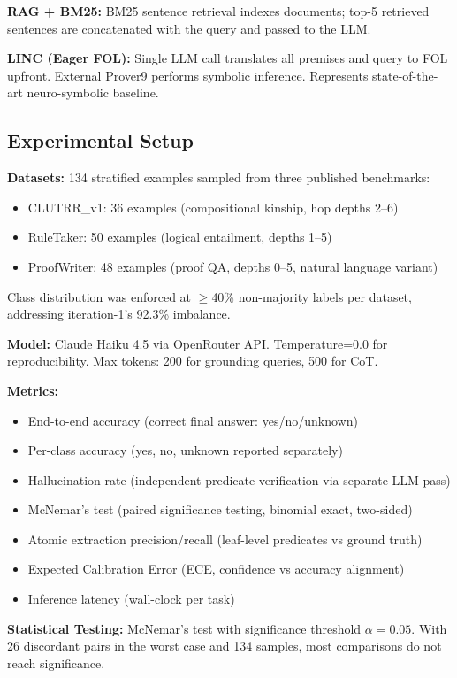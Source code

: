 \documentclass[11pt,letterpaper]{article}
\begin{document}
\textbf{RAG + BM25:} BM25 sentence retrieval indexes documents; top-5 retrieved sentences are concatenated with the query and passed to the LLM.

\textbf{LINC (Eager FOL):} Single LLM call translates all premises and query to FOL upfront. External Prover9 performs symbolic inference. Represents state-of-the-art neuro-symbolic baseline.

\subsection{Experimental Setup}

\textbf{Datasets:} 134 stratified examples sampled from three published benchmarks:
\begin{itemize}
  \item CLUTRR\_v1: 36 examples (compositional kinship, hop depths 2--6)
  \item RuleTaker: 50 examples (logical entailment, depths 1--5)
  \item ProofWriter: 48 examples (proof QA, depths 0--5, natural language variant)
\end{itemize}

Class distribution was enforced at $\geq$40\% non-majority labels per dataset, addressing iteration-1's 92.3\% imbalance.

\textbf{Model:} Claude Haiku 4.5 via OpenRouter API. Temperature=0.0 for reproducibility. Max tokens: 200 for grounding queries, 500 for CoT.

\textbf{Metrics:}
\begin{itemize}
  \item End-to-end accuracy (correct final answer: yes/no/unknown)
  \item Per-class accuracy (yes, no, unknown reported separately)
  \item Hallucination rate (independent predicate verification via separate LLM pass)
  \item McNemar's test (paired significance testing, binomial exact, two-sided)
  \item Atomic extraction precision/recall (leaf-level predicates vs ground truth)
  \item Expected Calibration Error (ECE, confidence vs accuracy alignment)
  \item Inference latency (wall-clock per task)
\end{itemize}

\textbf{Statistical Testing:} McNemar's test with significance threshold $\alpha=0.05$. With 26 discordant pairs in the worst case and 134 samples, most comparisons do not reach significance.
\end{document}
